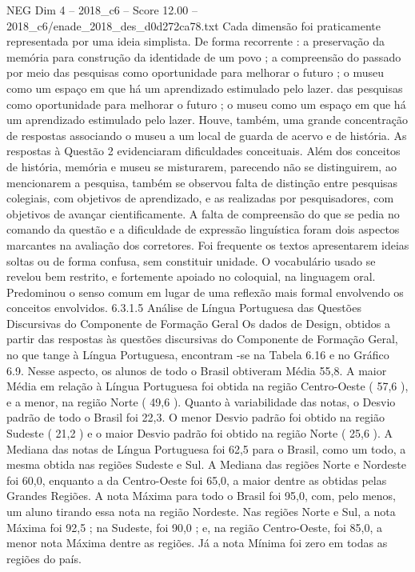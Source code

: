 \begin{textsample}{NEG Dim 4 – 2018\_c6 – Score 12.00 – 2018\_c6/enade\_2018\_des\_d0d272ca78.txt}
Cada dimensão foi praticamente representada por uma ideia simplista.
De forma recorrente : a preservação da memória para construção da identidade de um povo ; a compreensão do passado por meio das pesquisas como oportunidade para melhorar o futuro ; o museu como um espaço em que há um aprendizado estimulado pelo lazer. das pesquisas como oportunidade para melhorar o futuro ; o museu como um espaço em que há um aprendizado estimulado pelo lazer.
Houve, também, uma grande concentração de respostas associando o museu a um local de guarda de acervo e de história.
As respostas à Questão 2 evidenciaram dificuldades conceituais.
Além dos conceitos de história, memória e museu se misturarem, parecendo não se distinguirem, ao mencionarem a pesquisa, também se observou falta de distinção entre pesquisas colegiais, com objetivos de aprendizado, e as realizadas por pesquisadores, com objetivos de avançar cientificamente.
A falta de compreensão do que se pedia no comando da questão e a dificuldade de expressão linguística foram dois aspectos marcantes na avaliação dos corretores.
Foi frequente os textos apresentarem ideias soltas ou de forma confusa, sem constituir unidade.
O vocabulário usado se revelou bem restrito, e fortemente apoiado no coloquial, na linguagem oral.
Predominou o senso comum em lugar de uma reflexão mais formal envolvendo os conceitos envolvidos. 6.3.1.5 Análise de Língua Portuguesa das Questões Discursivas do Componente de Formação Geral Os dados de Design, obtidos a partir das respostas às questões discursivas do Componente de Formação Geral, no que tange à Língua Portuguesa, encontram -se na Tabela 6.16 e no Gráfico 6.9.
Nesse aspecto, os alunos de todo o Brasil obtiveram Média 55,8.
A maior Média em relação à Língua Portuguesa foi obtida na região Centro-Oeste ( 57,6 ), e a menor, na região Norte ( 49,6 ).
Quanto à variabilidade das notas, o Desvio padrão de todo o Brasil foi 22,3.
O menor Desvio padrão foi obtido na região Sudeste ( 21,2 ) e o maior Desvio padrão foi obtido na região Norte ( 25,6 ).
A Mediana das notas de Língua Portuguesa foi 62,5 para o Brasil, como um todo, a mesma obtida nas regiões Sudeste e Sul.
A Mediana das regiões Norte e Nordeste foi 60,0, enquanto a da Centro-Oeste foi 65,0, a maior dentre as obtidas pelas Grandes Regiões.
A nota Máxima para todo o Brasil foi 95,0, com, pelo menos, um aluno tirando essa nota na região Nordeste.
Nas regiões Norte e Sul, a nota Máxima foi 92,5 ; na Sudeste, foi 90,0 ; e, na região Centro-Oeste, foi 85,0, a menor nota Máxima dentre as regiões.
Já a nota Mínima foi zero em todas as regiões do país.

\end{textsample}

